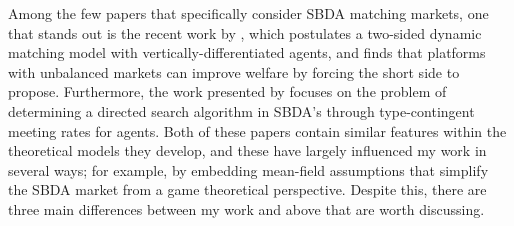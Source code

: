 Among the few papers that specifically consider SBDA matching markets, one that stands out is the recent work by \cite{kanoria2021facilitating}, which postulates a two-sided dynamic matching model with vertically-differentiated agents, and finds that platforms with unbalanced markets can improve welfare by forcing the short side to propose. Furthermore, the work presented by \cite{immorlica2021designing} focuses on the problem of determining a directed search algorithm in SBDA's through type-contingent meeting rates for agents. Both of these papers contain similar features within the theoretical models they develop, and these have largely influenced my work in several ways; for example, by embedding mean-field assumptions that simplify the SBDA market from a game theoretical perspective. Despite this, there are three main differences between my work and above that are worth discussing. %